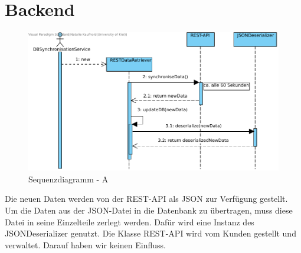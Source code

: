 


\section{Backend}

\begin{figure}[h]
	\centering
	\includegraphics[width=16cm]{img/diagrams/RESThandling.pdf}	
	\caption{Sequenzdiagramm - A}
	\label{fig:sequenz-a}
\end{figure}

\noindent
Die neuen Daten werden von der REST-API als JSON zur Verfügung gestellt. Um die Daten aus der JSON-Datei in die Datenbank zu übertragen, muss  diese Datei in seine Einzelteile zerlegt werden. Dafür wird eine Instanz des JSONDeserializer genutzt.
Die Klasse REST-API wird vom Kunden gestellt und verwaltet. Darauf haben wir keinen Einfluss.